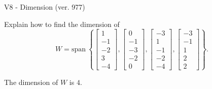 \begin{exercise}
  \begin{exerciseTitle}V8 - Dimension (ver. 977)\end{exerciseTitle}
  \begin{exerciseStatement}
    Explain how to find the dimension of 
\[W=\mathrm{span}\ \left\{\left[\begin{array}{r}
1 \\
-1 \\
-2 \\
3 \\
-4
\end{array}\right] , \left[\begin{array}{r}
0 \\
-1 \\
-3 \\
-2 \\
0
\end{array}\right] , \left[\begin{array}{r}
-3 \\
1 \\
-1 \\
-2 \\
-4
\end{array}\right] , \left[\begin{array}{r}
-3 \\
-1 \\
1 \\
2 \\
2
\end{array}\right]\right\}.\]



  \end{exerciseStatement}
  \begin{exerciseAnswer}
   The dimension of \(W\) is  \(4\).
  


  \end{exerciseAnswer}
\end{exercise}